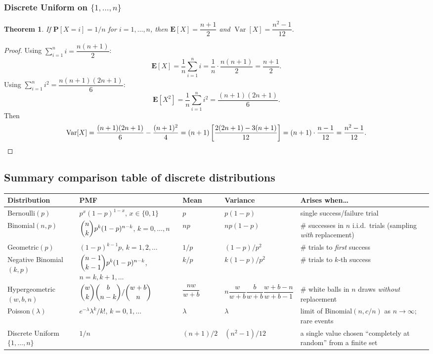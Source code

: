 \documentclass[11pt]{article}
\theoremstyle{definition}
\theoremstyle{plain}
\newtheorem{theorem}[definition]{Theorem}
\theoremstyle{remark}
\newcommand{\E}[1]{\mathbf{E}\!\left[#1\right]}
\newcommand{\Var}[1]{\operatorname{Var}\!\left[#1\right]}
\begin{document}
\subsubsection{Discrete Uniform on $\{1,\dots,n\}$}

\begin{theorem}
If $\mathbf{P}[X=i]=1/n$ for $i=1,\dots,n$, then $\E{X}=\dfrac{n+1}{2}$ and
$\Var{X}=\dfrac{n^2-1}{12}$.
\end{theorem}
\begin{proof}
Using $\sum_{i=1}^n i = \dfrac{n(n+1)}{2}$:
\[
\E{X} = \frac1n\sum_{i=1}^n i = \frac1n\cdot\frac{n(n+1)}{2} = \frac{n+1}{2}.
\]
Using $\sum_{i=1}^n i^2 = \dfrac{n(n+1)(2n+1)}{6}$:
\[
\E{X^2} = \frac1n\sum_{i=1}^n i^2 = \frac{(n+1)(2n+1)}{6}.
\]
Then
\[
\Var{X} = \frac{(n+1)(2n+1)}{6} - \frac{(n+1)^2}{4}
= (n+1)\left[\frac{2(2n+1)-3(n+1)}{12}\right]
= (n+1)\cdot\frac{n-1}{12} = \frac{n^2-1}{12}. \qedhere
\]
\end{proof}

\subsection{Summary comparison table of discrete distributions}

\begin{center}
\renewcommand{\arraystretch}{1.7}
\begin{longtable}{p{2.2cm} p{3.6cm} p{2.6cm} p{2.2cm} p{3.7cm}}
\toprule
\textbf{Distribution} & \textbf{PMF} & \textbf{Mean} & \textbf{Variance} & \textbf{Arises when\dots} \\
\midrule
Bernoulli$(p)$ & $p^x(1-p)^{1-x}$, $x\in\{0,1\}$ & $p$ & $p(1-p)$ & single success/failure trial \\
Binomial$(n,p)$ & $\dbinom{n}{k}p^k(1-p)^{n-k}$, $k=0,\dots,n$ & $np$ & $np(1-p)$ & \# successes in $n$ i.i.d.\ trials (sampling \emph{with} replacement) \\
Geometric$(p)$ & $(1-p)^{k-1}p$, $k=1,2,\dots$ & $1/p$ & $(1-p)/p^2$ & \# trials to \emph{first} success \\
Negative Binomial$(k,p)$ & $\dbinom{n-1}{k-1}p^k(1-p)^{n-k}$, $n=k,k+1,\dots$ & $k/p$ & $k(1-p)/p^2$ & \# trials to $k$-th success \\
Hypergeometric$(w,b,n)$ & $\dbinom{w}{k}\dbinom{b}{n-k}/\dbinom{w+b}{n}$ & $\dfrac{nw}{w+b}$ & $n\dfrac{w}{w+b}\dfrac{b}{w+b}\dfrac{w+b-n}{w+b-1}$ & \# white balls in $n$ draws \emph{without} replacement \\
Poisson$(\lambda)$ & $e^{-\lambda}\lambda^k/k!$, $k=0,1,\dots$ & $\lambda$ & $\lambda$ & limit of Binomial$(n,c/n)$ as $n\to\infty$; rare events \\
Discrete Uniform$\{1,\dots,n\}$ & $1/n$ & $(n+1)/2$ & $(n^2-1)/12$ & a single value chosen ``completely at random'' from a finite set \\
\bottomrule
\end{longtable}
\end{center}
\end{document}
